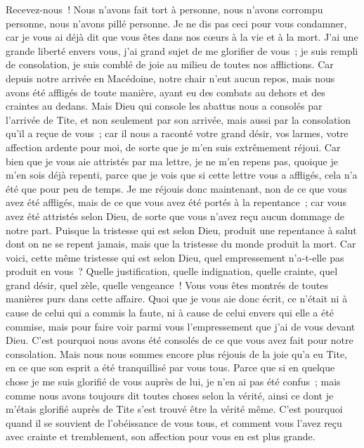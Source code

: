 \begin{multicols}{2}
Recevez-nous~! Nous n'avons fait tort à personne, nous n'avons corrompu personne, nous n'avons pillé personne.
Je ne dis pas ceci pour vous condamner, car je vous ai déjà dit que vous êtes dans nos cœurs à la vie et à la mort.
J'ai une grande liberté envers vous, j'ai grand sujet de me glorifier de vous~; je suis rempli de consolation, je suis comblé de joie au milieu de toutes nos afflictions.
Car depuis notre arrivée en Macédoine, notre chair n'eut aucun repos, mais nous avons été affligés de toute manière, ayant eu des combats au dehors et des craintes au dedans.
Mais Dieu qui console les abattus nous a consolés par l'arrivée de Tite,
et non seulement par son arrivée, mais aussi par la consolation qu'il a reçue de vous~; car il nous a raconté votre grand désir, vos larmes, votre affection ardente pour moi, de sorte que je m'en suis extrêmement réjoui.
Car bien que je vous aie attristés par ma lettre, je ne m'en repens pas, quoique je m'en sois déjà repenti, parce que je vois que si cette lettre vous a affligés, cela n'a été que pour peu de temps.
Je me réjouis donc maintenant, non de ce que vous avez été affligés, mais de ce que vous avez été portés à la repentance~; car vous avez été attristés selon Dieu, de sorte que vous n'avez reçu aucun dommage de notre part.
Puisque la tristesse qui est selon Dieu, produit une repentance à salut dont on ne se repent jamais, mais que la tristesse du monde produit la mort.
Car voici, cette même tristesse qui est selon Dieu, quel empressement n'a-t-elle pas produit en vous~? Quelle justification, quelle indignation, quelle crainte, quel grand désir, quel zèle, quelle vengeance~! Vous vous êtes montrés de toutes manières purs dans cette affaire.
Quoi que je vous aie donc écrit, ce n'était ni à cause de celui qui a commis la faute, ni à cause de celui envers qui elle a été commise, mais pour faire voir parmi vous l'empressement que j'ai de vous devant Dieu.
C'est pourquoi nous avons été consolés de ce que vous avez fait pour notre consolation. Mais nous nous sommes encore plus réjouis de la joie qu'a eu Tite, en ce que son esprit a été tranquillisé par vous tous.
Parce que si en quelque chose je me suis glorifié de vous auprès de lui, je n'en ai pas été confus~; mais comme nous avons toujours dit toutes choses selon la vérité, ainsi ce dont je m'étais glorifié auprès de Tite s'est trouvé être la vérité même.
C'est pourquoi quand il se souvient de l'obéissance de vous tous, et comment vous l'avez reçu avec crainte et tremblement, son affection pour vous en est plus grande.

\end{multicols}
